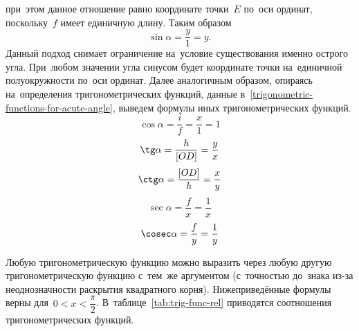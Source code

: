 \documentclass[]{scrartcl}
\begin{document}
при~этом данное отношение равно координате точки~${\textstyle E}$ по~оси ординат, поскольку~${\textstyle f}$ имеет единичную длину. Таким образом
\begin{equation}\label{eq:sinus-formula-2}
\sin \alpha = \frac{y}{1}=y.
\end{equation}
Данный подход снимает ограничение на~условие существования именно острого угла. При~любом значении угла синусом будет координате точки на~единичной полуокружности по~оси ординат. Далее аналогичным образом, опираясь на~определения тригонометрических функций, данные в~\ref{trigonometric-functions-for-acute-angle}, выведем формулы иных тригонометрических функций.
\begin{equation}\label{eq:cosinus-formula-1}
\cos \alpha = \frac{i}{f}=\frac{x}{1}=1
\end{equation}
\begin{equation}\label{eq:tangens-formula-1}
\tg \alpha = \frac{h}{[OD]}=\frac{y}{x}
\end{equation}
\begin{equation}\label{eq:cotangens-formula-1}
\ctg \alpha = \frac{[OD]}{h}=\frac{x}{y}
\end{equation}
\begin{equation}\label{eq:secans-formula-1}
\sec \alpha = \frac{f}{x}=\frac{1}{x}
\end{equation}
\begin{equation}\label{eq:cosecans-formula-1}
\cosec \alpha = \frac{f}{y}=\frac{1}{y}
\end{equation}

Любую тригонометрическую функцию можно выразить через любую другую тригонометрическую функцию с~тем~же аргументом (с~точностью до~знака из-за неоднозначности раскрытия квадратного корня). Нижеприведённые формулы верны для~$\textstyle 0 < x < \dfrac{\pi}{2}$. В~таблице~\ref{tab:trig-func-rel} приводятся соотношения тригонометрических функций.
\end{document}
